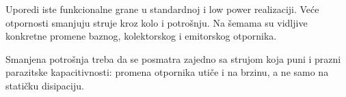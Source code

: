 Uporedi iste funkcionalne grane u standardnoj i low power realizaciji. Veće otpornosti smanjuju struje kroz kolo i potrošnju. Na šemama su vidljive konkretne promene baznog, kolektorskog i emitorskog otpornika.

Smanjena potrošnja treba da se posmatra zajedno sa strujom koja puni i prazni parazitske kapacitivnosti: promena otpornika utiče i na brzinu, a ne samo na statičku disipaciju.
